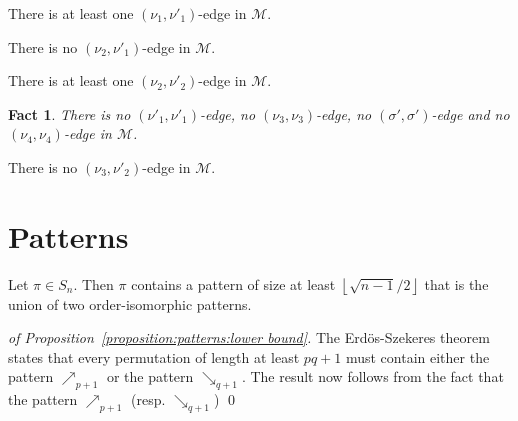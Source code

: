 \documentclass[a4paper,10pt]{llncs}
\newtheorem{fact}{Fact}
\begin{document}
\begin{claim}
  \label{fact:one (nu_1, nu'_1)-edge}
  There is at least one $(\nu_1, \nu'_1)$-edge in $\mathcal{M}$.
\end{claim}

\begin{claim}
  \label{fact:no (nu_2, nu'_1)-edge}
  There is no $(\nu_2, \nu'_1)$-edge in $\mathcal{M}$.
\end{claim}

\begin{claim}
  \label{fact:one (nu_2, nu'_2)-edge}
  There is at least one $(\nu_2, \nu'_2)$-edge in $\mathcal{M}$.
\end{claim}

\begin{fact}
  \label{fact:no (nu'_1, nu'_1),(nu_3, nu_3),(sigma' ,sigma'),(nu_4, nu_4)-edge}
  There is 
  no $(\nu'_1, \nu'_1)$-edge, 
  no $(\nu_3, \nu_3)$-edge,
  no $(\sigma', \sigma')$-edge and
  no $(\nu_4, \nu_4)$-edge
  in $\mathcal{M}$.
\end{fact}

\begin{claim}
  \label{fact:no (nu_3, nu'_2)-edge}
  There is no $(\nu_3, \nu'_2)$-edge in $\mathcal{M}$.
\end{claim}


\section{Patterns}
\label{section:Patterns}

\begin{proposition}
  \label{proposition:patterns:lower bound}
  Let $\pi \in S_{n}$.
  Then $\pi$ contains a pattern of size at least 
  $\left\lfloor\sqrt{n-1}/2\right\rfloor$ that
  is the union of two order-isomorphic patterns.
\end{proposition}

\begin{proof}[of Proposition~\ref{proposition:patterns:lower bound}]
  The Erdös-Szekeres theorem \cite{Erdos:Szekeres:1935} 
  states that every permutation of 
  length at least $pq+1$ must contain either the pattern
  $\nearrow_{p+1}$ or the pattern $\searrow_{q+1}$.
  The result now follows from the fact that
  the pattern $\nearrow_{p+1}$ (resp. $\searrow_{q+1}$)
\qed
\end{proof}
\end{document}
